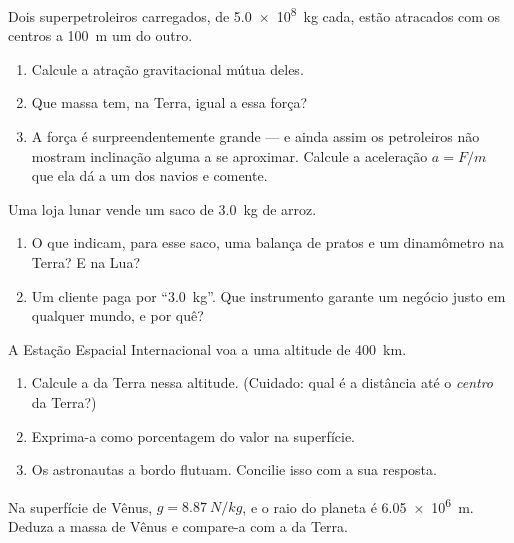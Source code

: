 \begin{exercise}[$\star\star$]\label{exo:g10:universal-gravitation:6}
Dois superpetroleiros carregados, de \qty{5.0e8}{kg} cada, estão
atracados com os centros a \qty{100}{m} um do outro.
\begin{enumerate}
  \item Calcule a atração gravitacional mútua deles.
  \item Que massa tem, na Terra,  igual a essa força?
  \item A força é surpreendentemente grande --- e ainda assim os
        petroleiros não mostram inclinação alguma a se aproximar. Calcule
        a aceleração $a = F/m$ que ela dá a um dos navios e comente.
\end{enumerate}
\end{exercise}

\begin{exercise}[$\star\star$]\label{exo:g10:universal-gravitation:7}
Uma loja lunar vende um saco de \qty{3.0}{kg} de arroz.
\begin{enumerate}
  \item O que indicam, para esse saco, uma balança de pratos e um
        dinamômetro na Terra? E na Lua?
  \item Um cliente paga por ``\qty{3.0}{kg}''. Que instrumento garante um
        negócio justo em qualquer mundo, e por quê?
\end{enumerate}
\end{exercise}

\begin{exercise}[$\star\star$]\label{exo:g10:universal-gravitation:8}
A Estação Espacial Internacional voa a uma altitude de \qty{400}{km}.
\begin{enumerate}
  \item Calcule a  da Terra nessa
        altitude. (Cuidado: qual é a distância até o \emph{centro} da
        Terra?)
  \item Exprima-a como porcentagem do valor na superfície.
  \item Os astronautas a bordo flutuam. Concilie isso com a sua resposta.
\end{enumerate}
\end{exercise}

\begin{exercise}[$\star\star$]\label{exo:g10:universal-gravitation:9}
Na superfície de Vênus, $g = \qty{8.87}{N/kg}$, e o raio do planeta é
\qty{6.05e6}{m}. Deduza a massa de Vênus e compare-a com a da Terra.
\end{exercise}

